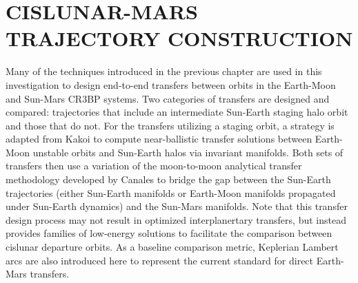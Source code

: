 \chapter{CISLUNAR-MARS TRAJECTORY CONSTRUCTION}

Many of the techniques introduced in the previous chapter are used in this investigation to design
end-to-end transfers between orbits in the Earth-Moon and Sun-Mars CR3BP systems. Two categories of
transfers are designed and compared: trajectories that include an intermediate Sun-Earth staging
halo orbit and those that do not. For the transfers utilizing a staging orbit, a strategy is
adapted from Kakoi to compute near-ballistic transfer solutions between Earth-Moon unstable orbits
and Sun-Earth halos via invariant manifolds\cite{Kakoi:2015}. Both sets of transfers then use a
variation of the moon-to-moon analytical transfer methodology developed by Canales to bridge the
gap between the Sun-Earth trajectories (either Sun-Earth manifolds or Earth-Moon manifolds
propagated under Sun-Earth dynamics) and the Sun-Mars manifolds\cite{Canales:2021b}. Note that this
transfer design process may not result in optimized interplanertary transfers, but instead provides
families of low-energy solutions to facilitate the comparison between cislunar departure orbits. As
a baseline comparison metric, Keplerian Lambert arcs are also introduced here to represent the
current standard for direct Earth-Mars transfers.





